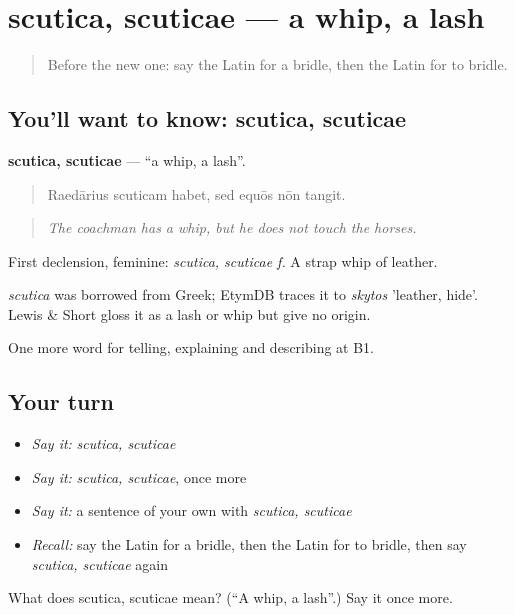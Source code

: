\section[scutica, scuticae]{scutica, scuticae — a whip, a lash}

\label{lesson:LA-C431-scutica}



\begin{quote}
Before the new one: say the Latin for a bridle, then the Latin for to bridle.
\end{quote}

\subsection*{You'll want to know: scutica, scuticae}
\textbf{scutica, scuticae} — \textquotedblleft{}a whip, a lash\textquotedblright{}.

\begin{quote}
Raedārius scuticam habet, sed equōs nōn tangit.
\end{quote}

\begin{quote}
\emph{The coachman has a whip, but he does not touch the horses.}
\end{quote}

First declension, feminine: \emph{scutica, scuticae f.} A strap whip of leather.

\begin{cousinweb}
\emph{scutica} was borrowed from Greek; EtymDB traces it to \emph{skytos} 'leather, hide'. Lewis \& Short gloss it as a lash or whip but give no origin.
\end{cousinweb}

\begin{grammarlens}[title={What you've built}]
One more word for telling, explaining and describing at B1.
\end{grammarlens}

\subsection*{Your turn}
\begin{itemize}
\raggedright
  \item \emph{Say it:} \emph{scutica, scuticae}
  \item \emph{Say it:} \emph{scutica, scuticae}, once more
  \item \emph{Say it:} a sentence of your own with \emph{scutica, scuticae}
  \item \emph{Recall:} say the Latin for a bridle, then the Latin for to bridle, then say \emph{scutica, scuticae} again
\end{itemize}

\begin{tcolorbox}[breakable,colback=teal!4,colframe=teal!35!black,title={Before you move on}]
What does scutica, scuticae mean? (\textquotedblleft{}A whip, a lash\textquotedblright{}.) Say it once more.
\end{tcolorbox}
